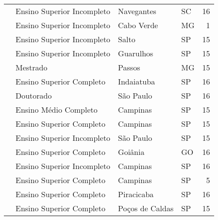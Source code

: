 \begin{table}[h]
\begin{tabular}{|l|l|l|l|r|}
                           & Ensino Superior Incompleto                & Navegantes          & SC & 16                      \\ \cline{2-5} 
                           & Ensino Superior Incompleto                & Cabo Verde          & MG & 1                       \\ \cline{2-5} 
                           & Ensino Superior Incompleto                & Salto               & SP & 15                      \\ \cline{2-5} 
                           & Ensino Superior Incompleto                & Guarulhos           & SP & 15                      \\ \cline{2-5} 
                           & Mestrado                                  & Passos              & MG & 15                      \\ \cline{2-5} 
                           & Ensino Superior Completo                  & Indaiatuba          & SP & 16                      \\ \cline{2-5} 
                           & Doutorado                                 & São Paulo           & SP & 16                      \\ \cline{2-5} 
                           & Ensino Médio Completo                     & Campinas            & SP & 15                      \\ \cline{2-5} 
                           & Ensino Superior Completo                  & Campinas            & SP & 15                      \\ \cline{2-5} 
                           & Ensino Superior Incompleto                & São Paulo           & SP & 15                      \\ \cline{2-5} 
                           & Ensino Superior Completo                  & Goiânia             & GO & 16                      \\ \cline{2-5} 
                           & Ensino Superior Incompleto                & Campinas            & SP & 16                      \\ \cline{2-5} 
                           & Ensino Superior Completo                  & Campinas            & SP & 5                       \\ \cline{2-5} 
                           & Ensino Superior Completo                  & Piracicaba          & SP & 16                      \\ \cline{2-5} 
                           & Ensino Superior Completo                  & Poços de Caldas     & SP & 15                      \\ \cline{2-5} 

\end{tabular}
\end{table}
